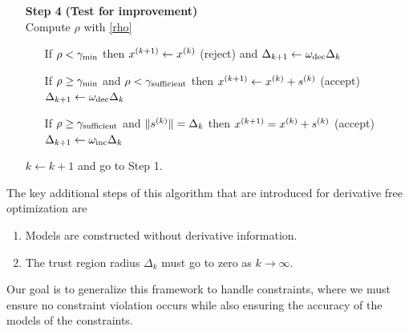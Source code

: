 \begin{algorithm}[H]
\begin{itemize}
        \item[\textbf{Step 4}] \textbf{(Test for improvement)} \\
            Compute $\rho$ with \cref{rho} \begin{itemize}
                \item[] If $\rho < \gamma_{\text{min}}$ then ${x}^{(k+1)} \gets {x}^{(k)}$ (reject) and $\Delta_{k+1} \gets \omega_{\text{dec}}\Delta_{k}$
                \item[] If $\rho \ge \gamma_{\text{min}}$ and $\rho < \gamma_{\text{sufficient}}$ then ${x}^{(k+1)}\gets{x}^{(k)}+{s}^{(k)}$ (accept) $\Delta_{k+1} \gets \omega_{\text{dec}}\Delta_{k}$
                \item[] If $\rho \ge \gamma_{\text{sufficient}}$ and $\|{s}^{(k)}\| = \Delta_{k}$ then ${x}^{(k+1)}={x}^{(k)}+{s}^{(k)}$ (accept) $\Delta_{k+1} \gets \omega_{\text{inc}}\Delta_{k}$
            \end{itemize}
            $k \gets k+1$ and go to Step 1.
    \end{itemize}
\end{algorithm}

The key additional steps of this algorithm that are introduced for derivative free optimization are
\begin{enumerate}
    \item Models are constructed without derivative information.
    \item The trust region radius $\Delta_k$ must go to zero as $k\to\infty$.
\end{enumerate}

Our goal is to generalize this framework to handle constraints, where we must ensure no constraint violation occurs while also ensuring the accuracy of the models of the constraints.
% 
%   
  

